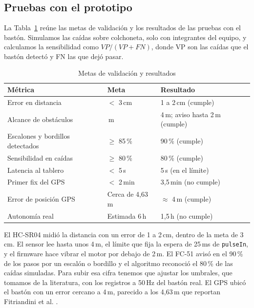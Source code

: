\documentclass[conference,a4paper]{IEEEtran}
\begin{document}
\subsection{Pruebas con el prototipo}

La Tabla~\ref{tab:resultados} reúne las metas de validación y los resultados de las pruebas con el bastón. Simulamos las caídas sobre colchoneta, solo con integrantes del equipo, y calculamos la sensibilidad como $VP/(VP+FN)$, donde VP son las caídas que el bastón detectó y FN las que dejó pasar.

\begin{table}[!t]
\caption{Metas de validación y resultados}
\label{tab:resultados}
\centering
\footnotesize
\renewcommand{\arraystretch}{1.15}
\begin{tabular}{>{\raggedright\arraybackslash}p{3.1cm} >{\raggedright\arraybackslash}p{1.9cm} p{2.3cm}}
\toprule
\textbf{Métrica} & \textbf{Meta} & \textbf{Resultado} \\
\midrule
Error en distancia & $<$ 3\,cm & 1 a 2\,cm (cumple) \\
Alcance de obstáculos & 2\,m & 4\,m; aviso hasta 2\,m (cumple) \\
Escalones y bordillos detectados & $\geq$ 85\,\% & 90\,\% (cumple) \\
Sensibilidad en caídas & $\geq$ 80\,\% & 80\,\% (cumple) \\
Latencia al tablero & $<$ 5\,s & 5\,s (en el límite) \\
Primer fix del GPS & $<$ 2\,min & 3,5\,min (no cumple) \\
Error de posición GPS & Cerca de 4,63\,m \cite{fitriandini} & $\approx$ 4\,m (cumple) \\
Autonomía real & Estimada 6\,h & 1,5\,h (no cumple) \\
\bottomrule
\end{tabular}
\end{table}

El HC-SR04 midió la distancia con un error de 1 a 2\,cm, dentro de la meta de 3\,cm. El sensor lee hasta unos 4\,m, el límite que fija la espera de 25\,ms de \texttt{pulseIn}, y el firmware hace vibrar el motor por debajo de 2\,m. El FC-51 avisó en el 90\,\% de los pasos por un escalón o bordillo y el algoritmo reconoció el 80\,\% de las caídas simuladas. Para subir esa cifra tenemos que ajustar los umbrales, que tomamos de la literatura, con los registros a 50\,Hz del bastón real. El GPS ubicó el bastón con un error cercano a 4\,m, parecido a los 4,63\,m que reportan Fitriandini et al. \cite{fitriandini}.
\end{document}

